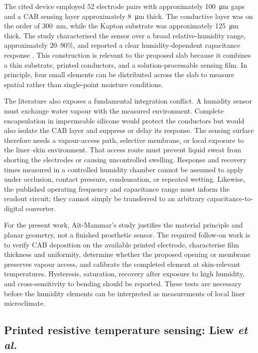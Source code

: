 \documentclass[12pt,a4paper]{article}
\begin{document}
The cited device employed 52 electrode pairs with approximately
\SI{100}{\micro\metre} gaps and a CAB sensing layer approximately
\SI{8}{\micro\metre} thick. The conductive layer was on the order of
\SI{300}{\nano\metre}, while the Kapton substrate was approximately
\SI{125}{\micro\metre} thick. The study characterised the sensor over a broad
relative-humidity range, approximately \(20\)--\(90\%\), and reported a clear
humidity-dependent capacitance response \cite{aitmammar2020}. This construction
is relevant to the proposed slab because it combines a thin substrate, printed
conductors, and a solution-processable sensing film. In principle, four small
elements can be distributed across the slab to measure spatial rather than
single-point moisture conditions.

The literature also exposes a fundamental integration conflict. A humidity
sensor must exchange water vapour with the measured environment. Complete
encapsulation in impermeable silicone would protect the conductors but would
also isolate the CAB layer and suppress or delay its response. The sensing
surface therefore needs a vapour-access path, selective membrane, or local
exposure to the liner--skin environment. That access route must prevent liquid
sweat from shorting the electrodes or causing uncontrolled swelling. Response
and recovery times measured in a controlled humidity chamber cannot be assumed
to apply under occlusion, contact pressure, condensation, or repeated wetting.
Likewise, the published operating frequency and capacitance range must inform
the readout circuit; they cannot simply be transferred to an arbitrary
capacitance-to-digital converter.

For the present work, Aït-Mammar's study justifies the material principle and
planar geometry, not a finished prosthetic sensor. The required follow-on work
is to verify CAB deposition on the available printed electrode, characterise
film thickness and uniformity, determine whether the proposed opening or
membrane preserves vapour access, and calibrate the completed element at
skin-relevant temperatures. Hysteresis, saturation, recovery after exposure to
high humidity, and cross-sensitivity to bending should be reported. These tests
are necessary before the humidity elements can be interpreted as measurements
of local liner microclimate.

\subsection{Printed resistive temperature sensing: Liew \textit{et al.}}
\end{document}
